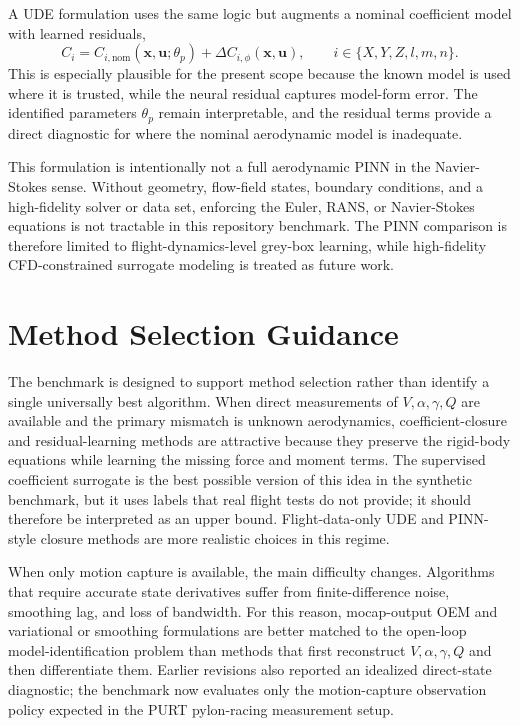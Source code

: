 \documentclass[11pt]{article}
\begin{document}
A UDE formulation uses the same logic but augments a nominal coefficient model with learned residuals,
\[
C_i = C_{i,\mathrm{nom}}(\mathbf{x},\mathbf{u};\theta_p)+\Delta C_{i,\phi}(\mathbf{x},\mathbf{u}),
\qquad i\in\{X,Y,Z,l,m,n\}.
\]
This is especially plausible for the present scope because the known model is used where it is trusted, while the neural residual captures model-form error. The identified parameters $\theta_p$ remain interpretable, and the residual terms provide a direct diagnostic for where the nominal aerodynamic model is inadequate.

This formulation is intentionally not a full aerodynamic PINN in the Navier-Stokes sense. Without geometry, flow-field states, boundary conditions, and a high-fidelity solver or data set, enforcing the Euler, RANS, or Navier-Stokes equations is not tractable in this repository benchmark. The PINN comparison is therefore limited to flight-dynamics-level grey-box learning, while high-fidelity CFD-constrained surrogate modeling is treated as future work.




\section{Method Selection Guidance}
The benchmark is designed to support method selection rather than identify a
single universally best algorithm. When direct measurements of
$V,\alpha,\gamma,Q$ are available and the primary mismatch is unknown
aerodynamics, coefficient-closure and residual-learning methods are attractive
because they preserve the rigid-body equations while learning the missing force
and moment terms. The supervised coefficient surrogate is the best possible
version of this idea in the synthetic benchmark, but it uses labels that real
flight tests do not provide; it should therefore be interpreted as an upper
bound. Flight-data-only UDE and PINN-style closure methods are more realistic
choices in this regime.

When only motion capture is available, the main difficulty changes. Algorithms
that require accurate state derivatives suffer from finite-difference noise,
smoothing lag, and loss of bandwidth. For this reason, mocap-output OEM and
variational or smoothing formulations are better
matched to the open-loop model-identification problem than methods that first reconstruct
$V,\alpha,\gamma,Q$ and then differentiate them. Earlier revisions also
reported an idealized direct-state diagnostic; the benchmark now evaluates only
the motion-capture observation policy expected in the PURT pylon-racing
measurement setup.
\end{document}
